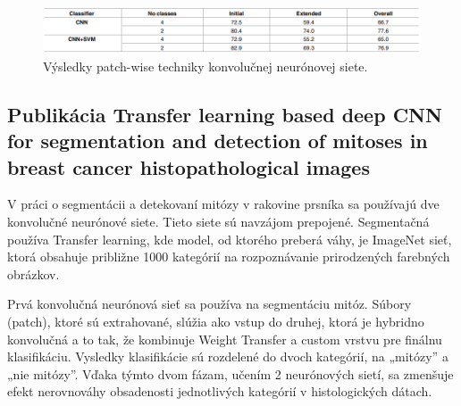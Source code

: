\begin{figure}[h!]
\begin{centering}
\includegraphics[width=15cm]{assets/images/252_5.png}
\par\end{centering}
\caption{Výsledky patch-wise techniky konvolučnej neurónovej siete. \label{fig:vysledkyPatch-Wise}\cite{araujo2017classification}}
\end{figure}

\subsection{Publikácia Transfer learning based deep CNN for segmentation and detection of mitoses in breast cancer histopathological images}

\hspace{10mm}V práci o segmentácii a detekovaní mitózy v rakovine prsníka sa používajú dve konvolučné neurónové siete. Tieto siete sú navzájom prepojené. Segmentačná používa Transfer learning, kde model, od ktorého preberá váhy, je ImageNet sieť, ktorá obsahuje približne 1000 kategórií na rozpoznávanie prirodzených farebných obrázkov.

\hspace{10mm}Prvá konvolučná neurónová sieť sa používa na segmentáciu mitóz. Súbory (patch), ktoré sú extrahované,  slúžia ako vstup do druhej, ktorá je hybridno konvolučná a to tak, že kombinuje Weight Transfer a custom vrstvu pre finálnu klasifikáciu. Vysledky klasifikácie sú rozdelené do dvoch kategórií, na „mitózy” a „nie mitózy”. Vďaka týmto dvom fázam, učením 2 neurónových sietí, sa zmenšuje efekt nerovnováhy obsadenosti jednotlivých kategórií v histologických dátach.


